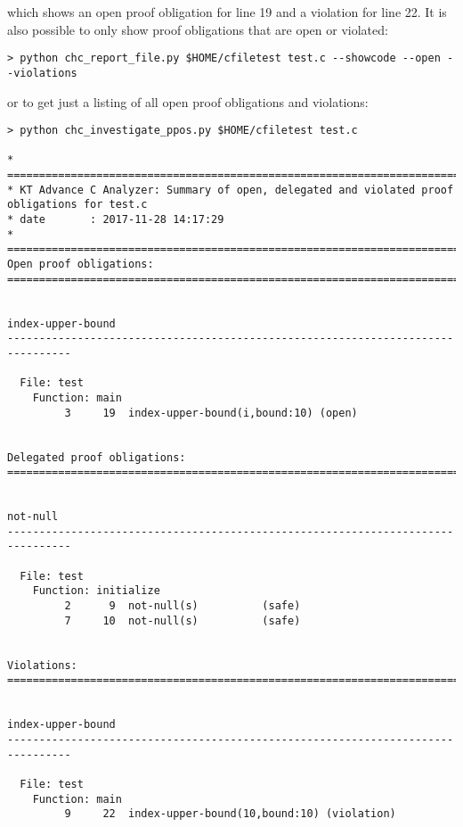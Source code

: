 \documentclass[11pt]{article}
\begin{document}
which shows an open proof obligation for line 19 and a violation for line 22. It is also
possible to only show proof obligations that are open or violated:
\begin{verbatim}
> python chc_report_file.py $HOME/cfiletest test.c --showcode --open --violations
\end{verbatim}
or to get just a listing of all open proof obligations and violations:
\begin{scriptsize}
\begin{verbatim}
> python chc_investigate_ppos.py $HOME/cfiletest test.c 

* ================================================================================
* KT Advance C Analyzer: Summary of open, delegated and violated proof obligations for test.c
* date       : 2017-11-28 14:17:29
* ================================================================================
Open proof obligations:
================================================================================


index-upper-bound
--------------------------------------------------------------------------------

  File: test
    Function: main
         3     19  index-upper-bound(i,bound:10) (open)


Delegated proof obligations:
================================================================================


not-null
--------------------------------------------------------------------------------

  File: test
    Function: initialize
         2      9  not-null(s)          (safe)
         7     10  not-null(s)          (safe)


Violations:
================================================================================


index-upper-bound
--------------------------------------------------------------------------------

  File: test
    Function: main
         9     22  index-upper-bound(10,bound:10) (violation)
\end{verbatim}
\end{scriptsize}





\end{document}
